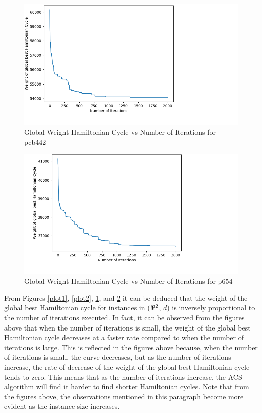 \documentclass[12pt]{article}
\numberwithin{equation}{subsection}
\numberwithin{table}{subsection}
\numberwithin{algorithm}{subsection}
\numberwithin{figure}{subsection}
\begin{document}
\begin{figure}[H]
  \centering
  \caption{Global Weight Hamiltonian Cycle vs Number of Iterations for pcb442}
  \label{plot3}
  \includegraphics[scale=0.8]{screenshots/screenshot4.png}
\end{figure}
\begin{figure}[H]
  \centering
  \caption{Global Weight Hamiltonian Cycle vs Number of Iterations for p654}
  \label{plot4}
  \includegraphics[scale=0.8]{screenshots/screenshot5.png}
\end{figure}
From Figures \ref{plot1}, \ref{plot2}, \ref{plot3}, and \ref{plot4} it can be deduced that the weight of the global best Hamiltonian cycle for instances in ($\real^2$, $d$) is inversely proportional to the number of iterations executed. In fact, it can be observed from the figures above that when the number of iterations is small, the weight of the global best Hamiltonian cycle decreases at a faster rate compared to when the number of iterations is large. This is reflected in the figures above because, when the number of iterations is small, the curve decreases, but as the number of iterations increase, the rate of decrease of the weight of the global best Hamiltonian cycle tends to zero. This means that as the number of iterations increase, the ACS algorithm will find it harder to find shorter Hamiltonian cycles. Note that from the figures above, the observations mentioned in this paragraph become more evident as the instance size increases.\\\\
\end{document}
